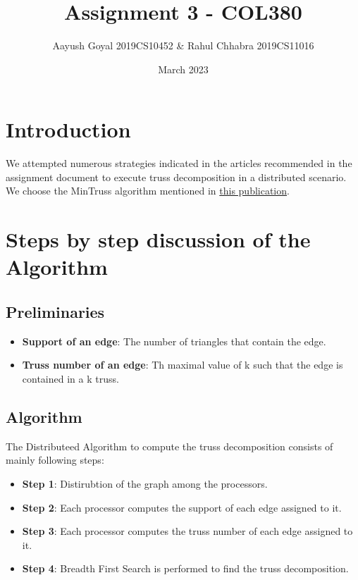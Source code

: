 \documentclass{article}
\title{Assignment 3 - COL380}
\author{Aayush Goyal 2019CS10452 & Rahul Chhabra 2019CS11016}
\date{March 2023}
\begin{document}
\maketitle

\tableofcontents


\section{Introduction}
We attempted numerous strategies indicated in the articles recommended in the assignment document to execute truss decomposition in a distributed scenario. We choose the MinTruss algorithm mentioned in \href{https://link.springer.com/chapter/10.1007/978-3-319-96983-1_50}{this publication}.

\section{Steps by step discussion of the Algorithm}
\subsection{Preliminaries}
\begin{itemize}
    \item \textbf{Support of an edge}: The number of triangles that contain the edge.
    \item \textbf{Truss number of an edge}: Th maximal value of k such that the edge is contained in a k truss.
\end{itemize}

\subsection{Algorithm}

The Distributeed Algorithm to compute the truss decomposition consists of mainly following steps:
\begin{itemize}
    \item \textbf{Step 1}: Distirubtion of the graph among the processors.
    \item \textbf{Step 2}: Each processor computes the support of each edge assigned to it.
    \item \textbf{Step 3}: Each processor computes the truss number of each edge assigned to it.
    \item \textbf{Step 4}: Breadth First Search is performed to find the truss decomposition.
\end{itemize}
\end{document}
